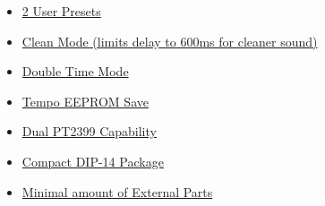 \documentclass[a4paper, 10pt]{article}
\begin{document}
\begin{multicols}{2}
\begin{itemize}
\item \hyperref[sec:userpresets]{2 User Presets}
\item \hyperref[sec:cleanmode]{Clean Mode (limits delay to 600ms for cleaner sound)}
\item \hyperref[sec:doubletime]{Double Time Mode}
\item \hyperref[sec:temposave]{Tempo EEPROM Save}
\item \hyperref[sec:dualpt]{Dual PT2399 Capability}
\item \hyperref[sec:pinconfig]{Compact DIP-14 Package}
\item \hyperref[sec:typappsche]{Minimal amount of External Parts}
\end{itemize}
\end{multicols}

\newpage
\headheight=35pt
\tableofcontents
\newpage
\end{document}
